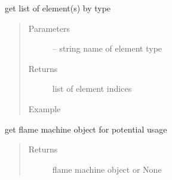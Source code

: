 \documentclass[letterpaper,10pt,english]{sphinxmanual}
\begin{document}
\begin{fulllineitems}
\begin{fulllineitems}
\end{fulllineitems}


\begin{fulllineitems}
\label{\detokenize{src/apidocs/genopt:genopt.DakotaOC.get_elem_by_type}}
get list of element(s) by type
\begin{quote}\begin{description}
\item[{Parameters}] \leavevmode
{} -- string name of element type

\item[{Returns}] \leavevmode
list of element indices

\item[{Example}] \leavevmode
\end{description}\end{quote}

\begin{sphinxVerbatim}[commandchars=\\\{\},formatcom=\scriptsize]
  
  
  
\end{sphinxVerbatim}

\end{fulllineitems}


\begin{fulllineitems}
\label{\detokenize{src/apidocs/genopt:genopt.DakotaOC.get_machine}}
get flame machine object for potential usage
\begin{quote}\begin{description}
\item[{Returns}] \leavevmode
flame machine object or None

\end{description}\end{quote}


\end{fulllineitems}
\end{fulllineitems}
\end{document}
